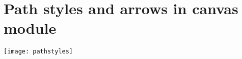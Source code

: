 \chapter{Path styles and arrows in canvas module}
\label{pathstyles}
\centerline{\texttt{[image: pathstyles]}}
